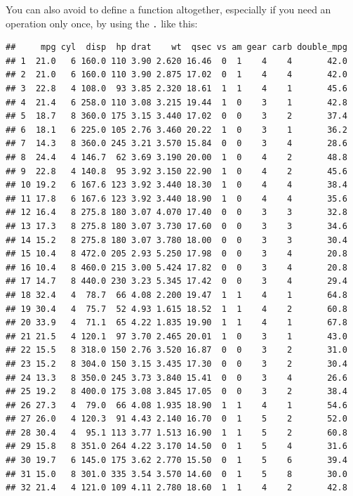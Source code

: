 \documentclass[]{gitbook}
\newenvironment{Shaded}{\begin{snugshade}}{\end{snugshade}}
\newcommand{\DataTypeTok}[1]{\textcolor[rgb]{0.13,0.29,0.53}{#1}}
\newcommand{\KeywordTok}[1]{\textcolor[rgb]{0.13,0.29,0.53}{\textbf{#1}}}
\newcommand{\NormalTok}[1]{#1}
\newcommand{\OperatorTok}[1]{\textcolor[rgb]{0.81,0.36,0.00}{\textbf{#1}}}
\newcommand{\StringTok}[1]{\textcolor[rgb]{0.31,0.60,0.02}{#1}}
\theoremstyle{definition}
\theoremstyle{definition}
\theoremstyle{definition}
\theoremstyle{remark}
\begin{document}
You can also avoid to define a function altogether, especially if you
need an operation only once, by using the \texttt{.} like this:

\begin{Shaded}
\end{Shaded}

\begin{verbatim}
##     mpg cyl  disp  hp drat    wt  qsec vs am gear carb double_mpg
## 1  21.0   6 160.0 110 3.90 2.620 16.46  0  1    4    4       42.0
## 2  21.0   6 160.0 110 3.90 2.875 17.02  0  1    4    4       42.0
## 3  22.8   4 108.0  93 3.85 2.320 18.61  1  1    4    1       45.6
## 4  21.4   6 258.0 110 3.08 3.215 19.44  1  0    3    1       42.8
## 5  18.7   8 360.0 175 3.15 3.440 17.02  0  0    3    2       37.4
## 6  18.1   6 225.0 105 2.76 3.460 20.22  1  0    3    1       36.2
## 7  14.3   8 360.0 245 3.21 3.570 15.84  0  0    3    4       28.6
## 8  24.4   4 146.7  62 3.69 3.190 20.00  1  0    4    2       48.8
## 9  22.8   4 140.8  95 3.92 3.150 22.90  1  0    4    2       45.6
## 10 19.2   6 167.6 123 3.92 3.440 18.30  1  0    4    4       38.4
## 11 17.8   6 167.6 123 3.92 3.440 18.90  1  0    4    4       35.6
## 12 16.4   8 275.8 180 3.07 4.070 17.40  0  0    3    3       32.8
## 13 17.3   8 275.8 180 3.07 3.730 17.60  0  0    3    3       34.6
## 14 15.2   8 275.8 180 3.07 3.780 18.00  0  0    3    3       30.4
## 15 10.4   8 472.0 205 2.93 5.250 17.98  0  0    3    4       20.8
## 16 10.4   8 460.0 215 3.00 5.424 17.82  0  0    3    4       20.8
## 17 14.7   8 440.0 230 3.23 5.345 17.42  0  0    3    4       29.4
## 18 32.4   4  78.7  66 4.08 2.200 19.47  1  1    4    1       64.8
## 19 30.4   4  75.7  52 4.93 1.615 18.52  1  1    4    2       60.8
## 20 33.9   4  71.1  65 4.22 1.835 19.90  1  1    4    1       67.8
## 21 21.5   4 120.1  97 3.70 2.465 20.01  1  0    3    1       43.0
## 22 15.5   8 318.0 150 2.76 3.520 16.87  0  0    3    2       31.0
## 23 15.2   8 304.0 150 3.15 3.435 17.30  0  0    3    2       30.4
## 24 13.3   8 350.0 245 3.73 3.840 15.41  0  0    3    4       26.6
## 25 19.2   8 400.0 175 3.08 3.845 17.05  0  0    3    2       38.4
## 26 27.3   4  79.0  66 4.08 1.935 18.90  1  1    4    1       54.6
## 27 26.0   4 120.3  91 4.43 2.140 16.70  0  1    5    2       52.0
## 28 30.4   4  95.1 113 3.77 1.513 16.90  1  1    5    2       60.8
## 29 15.8   8 351.0 264 4.22 3.170 14.50  0  1    5    4       31.6
## 30 19.7   6 145.0 175 3.62 2.770 15.50  0  1    5    6       39.4
## 31 15.0   8 301.0 335 3.54 3.570 14.60  0  1    5    8       30.0
## 32 21.4   4 121.0 109 4.11 2.780 18.60  1  1    4    2       42.8
\end{verbatim}
\end{document}
